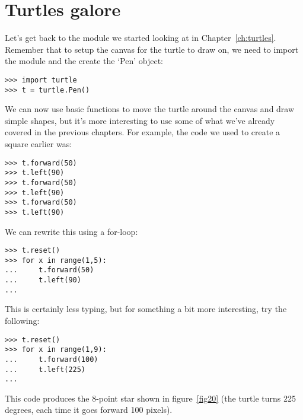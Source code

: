 

\chapter{Turtles galore}\label{ch:turtlesgalore}

Let's get back to the  module we started looking at in Chapter~\ref{ch:turtles}. Remember that to setup the canvas for the turtle to draw on, we need to import the module and the create the `Pen' object:

\begin{Verbatim}[frame=single]
>>> import turtle
>>> t = turtle.Pen()
\end{Verbatim}

We can now use basic functions to move the turtle around the canvas and draw simple shapes, but it's more interesting to use some of what we've already covered in the previous chapters.  For example, the code we used to create a square earlier was:

\begin{Verbatim}[frame=single]
>>> t.forward(50)
>>> t.left(90)
>>> t.forward(50)
>>> t.left(90)
>>> t.forward(50)
>>> t.left(90)
\end{Verbatim}

\noindent
We can rewrite this using a for-loop:

\begin{Verbatim}[frame=single]
>>> t.reset()
>>> for x in range(1,5):
...     t.forward(50)
...     t.left(90)
...
\end{Verbatim}

This is certainly less typing, but for something a bit more interesting, try the following:

\begin{Verbatim}[frame=single]
>>> t.reset()
>>> for x in range(1,9):
...     t.forward(100)
...     t.left(225)
...
\end{Verbatim}

This code produces the 8-point star shown in figure~\ref{fig20} (the turtle turns 225 degrees, each time it goes forward 100 pixels).

